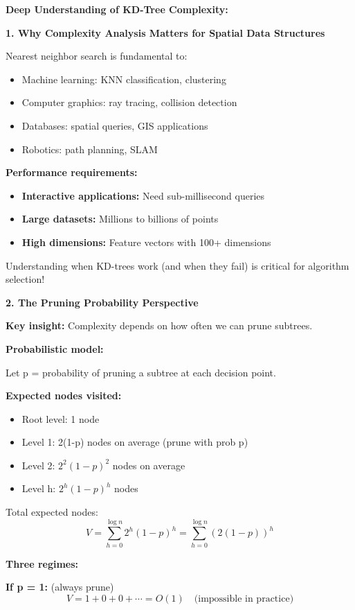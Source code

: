 \documentclass[12pt]{article}
\begin{document}
\begin{explanation}
\textbf{Deep Understanding of KD-Tree Complexity:}

\textbf{1. Why Complexity Analysis Matters for Spatial Data Structures}

Nearest neighbor search is fundamental to:
\begin{itemize}
    \item Machine learning: KNN classification, clustering
    \item Computer graphics: ray tracing, collision detection
    \item Databases: spatial queries, GIS applications
    \item Robotics: path planning, SLAM
\end{itemize}

\textbf{Performance requirements:}
\begin{itemize}
    \item \textbf{Interactive applications:} Need sub-millisecond queries
    \item \textbf{Large datasets:} Millions to billions of points
    \item \textbf{High dimensions:} Feature vectors with 100+ dimensions
\end{itemize}

Understanding when KD-trees work (and when they fail) is critical for algorithm selection!

\textbf{2. The Pruning Probability Perspective}

\textbf{Key insight:} Complexity depends on how often we can prune subtrees.

\textbf{Probabilistic model:}

Let p = probability of pruning a subtree at each decision point.

\textbf{Expected nodes visited:}
\begin{itemize}
    \item Root level: 1 node
    \item Level 1: 2(1-p) nodes on average (prune with prob p)
    \item Level 2: $2^2(1-p)^2$ nodes on average
    \item Level h: $2^h(1-p)^h$ nodes
\end{itemize}

Total expected nodes:
\[
V = \sum_{h=0}^{\log n} 2^h(1-p)^h = \sum_{h=0}^{\log n} (2(1-p))^h
\]

\textbf{Three regimes:}

\textbf{If p = 1:} (always prune)
\[
V = 1 + 0 + 0 + \cdots = O(1) \quad \text{(impossible in practice)}
\]


\end{explanation}
\end{document}
